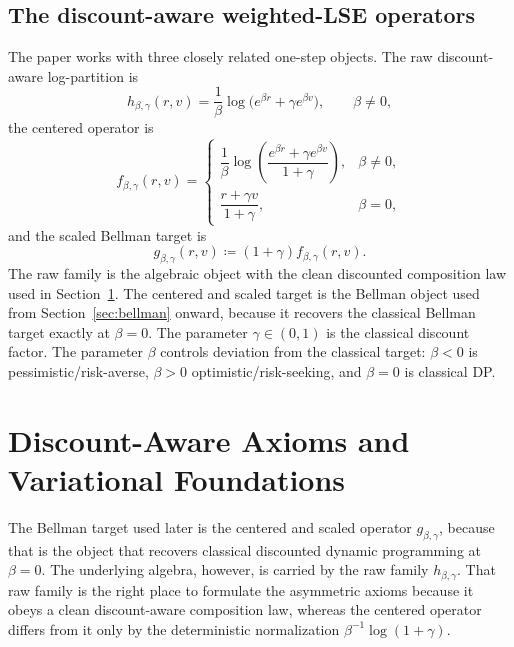 \documentclass{article}
\theoremstyle{remark}
\newcommand{\defeq}{\coloneqq}
\newcommand{\fbg}{f_{\beta,\gamma}}
\newcommand{\gbg}{g_{\beta,\gamma}}
\begin{document}
\subsection{The discount-aware weighted-LSE operators}
The paper works with three closely related one-step objects.
The raw discount-aware log-partition is
\[
 h_{\beta,\gamma}(r,v)=\frac{1}{\beta}\log\!\bigl(e^{\beta r}+\gamma e^{\beta v}\bigr),
 \qquad \beta\neq 0,
\]
the centered operator is
\begin{equation}
\fbg(r,v)
=
\begin{cases}
\dfrac{1}{\beta}\log\!\left(\dfrac{e^{\beta r}+\gamma e^{\beta v}}{1+\gamma}\right), & \beta\neq 0,\\[1.2ex]
\dfrac{r+\gamma v}{1+\gamma}, & \beta = 0,
\end{cases}
\label{eq:weighted-lse}
\end{equation}
and the scaled Bellman target is
\begin{equation}
\gbg(r,v) \defeq (1+\gamma)\fbg(r,v).
\label{eq:weighted-target}
\end{equation}
The raw family is the algebraic object with the clean discounted composition law used in Section~\ref{sec:axioms}.
The centered and scaled target is the Bellman object used from Section~\ref{sec:bellman} onward, because it recovers the classical Bellman target exactly at $\beta=0$.
The parameter $\gamma\in(0,1)$ is the classical discount factor.
The parameter $\beta$ controls deviation from the classical target: $\beta<0$ is pessimistic/risk-averse, $\beta>0$ optimistic/risk-seeking, and $\beta=0$ is classical DP.

\section{Discount-Aware Axioms and Variational Foundations}
\label{sec:axioms}

The Bellman target used later is the centered and scaled operator $g_{\beta,\gamma}$, because that is the object that recovers classical discounted dynamic programming at $\beta=0$.
The underlying algebra, however, is carried by the raw family $h_{\beta,\gamma}$.
That raw family is the right place to formulate the asymmetric axioms because it obeys a clean discount-aware composition law, whereas the centered operator differs from it only by the deterministic normalization $\beta^{-1}\log(1+\gamma)$.
\end{document}

